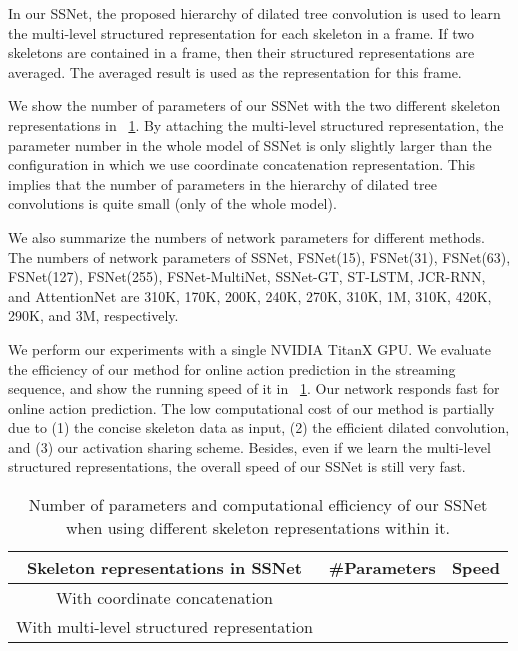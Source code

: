 \documentclass[10pt,twocolumn,letterpaper]{article}
\begin{document}
In our SSNet, the proposed hierarchy of dilated tree convolution is used to learn the multi-level structured representation for each skeleton in a frame.
If two skeletons are contained in a frame, then their structured representations are averaged.
The averaged result is used as the representation for this frame.





We show the number of parameters of our SSNet with the two different skeleton representations in \tablename{~\ref{table:paraAndSpeed}}.
By attaching the multi-level structured representation,
the parameter number in the whole model of SSNet is only slightly larger than the configuration in which we use coordinate concatenation representation.
This implies that the number of parameters in the hierarchy of dilated tree convolutions is quite small (only  of the whole model).


We also summarize the numbers of network parameters for different methods.
The numbers of network parameters of
SSNet,  FSNet(15), FSNet(31), FSNet(63), FSNet(127), FSNet(255), FSNet-MultiNet,  SSNet-GT, ST-LSTM, JCR-RNN, and AttentionNet are
310K,   170K,      200K,      240K,      270K,       310K,       1M,              310K,     420K,    290K,    and 3M,      respectively.

We perform our experiments with a single NVIDIA TitanX GPU.
We evaluate the efficiency of our method for online action prediction in the streaming sequence, and show the running speed of it in \tablename{~\ref{table:paraAndSpeed}}.
Our network responds fast for online action prediction. The low computational cost of our method is partially due to (1) the concise skeleton data as input, (2) the efficient dilated convolution, and (3) our activation sharing scheme.
Besides, even if we learn the multi-level structured representations, the overall speed of our SSNet is still very fast.






\begin{table}[h]
\caption{
Number of parameters and computational efficiency of our SSNet when using different skeleton representations within it.
}
\label{table:paraAndSpeed}
\centering
\begin{tabular}{ccc}
\toprule
Skeleton representations in SSNet         & \#Parameters      & Speed    \\
\midrule
With coordinate concatenation                 &             &       \\
With multi-level structured representation    &             &         \\
\bottomrule
\end{tabular}
\end{table}
\end{document}

